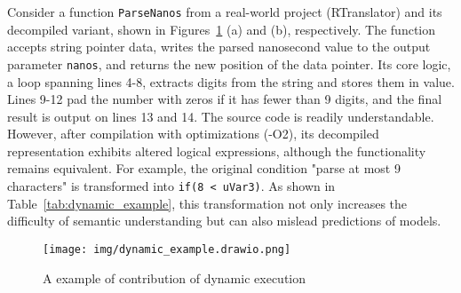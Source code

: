 \documentclass[acmsmall,screen,review,anonymous]{acmart} %
\begin{document}
Consider a function \lstinline{ParseNanos} from a real-world project (RTranslator) and its decompiled variant, shown in Figures~\ref{fig:dynamic_example} (a) and (b), respectively. The function accepts string pointer data, writes the parsed nanosecond value to the output parameter \lstinline{nanos}, and returns the new position of the data pointer. Its core logic, a loop spanning lines 4-8, extracts digits from the string and stores them in value. Lines 9-12 pad the number with zeros if it has fewer than 9 digits, and the final result is output on lines 13 and 14. The source code is readily understandable. However, after compilation with optimizations (-O2), its decompiled representation exhibits altered logical expressions, although the functionality remains equivalent. For example, the original condition "parse at most 9 characters" is transformed into \lstinline{if(8 < uVar3)}. As shown in Table~\ref{tab:dynamic_example}, this transformation not only increases the difficulty of semantic understanding but can also mislead predictions of models.

\begin{figure}[h] %
    \centering
    \texttt{[image: img/dynamic\_example.drawio.png]} %
    \caption{A example of contribution of dynamic execution} %
    \label{fig:dynamic_example} %
\end{figure}

\end{document}
